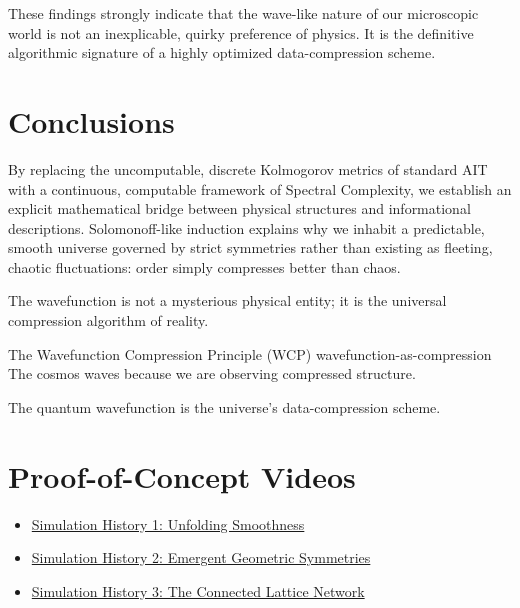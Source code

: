 These findings strongly indicate that the wave-like nature of our microscopic world is not an inexplicable, quirky preference of physics.
It is the definitive algorithmic signature of a highly optimized data-compression scheme.

\section{Conclusions}

By replacing the uncomputable, discrete Kolmogorov metrics of standard AIT with a continuous, computable framework of Spectral Complexity, we establish an explicit mathematical bridge between physical structures and informational descriptions.
Solomonoff-like induction explains why we inhabit a predictable, smooth universe governed by strict symmetries rather than existing as fleeting, chaotic fluctuations: order simply compresses
better than chaos.

The wavefunction is not a mysterious physical entity; it is the universal compression algorithm of reality.

\begin{principle}{The Wavefunction Compression Principle (WCP)}
{wavefunction-as-compression}
The cosmos waves because we are observing compressed structure.

The quantum wavefunction is the universe's data-compression scheme.
\end{principle}

\section{Proof-of-Concept Videos}

\begin{itemize}
    \item \href{https://youtube.com/shorts/sfwz_O_soS4?feature=share}{Simulation History 1: Unfolding Smoothness}
    \item \href{https://youtube.com/shorts/5XYXhmOgiW8}{Simulation History 2: Emergent Geometric Symmetries}
    \item \href{https://youtube.com/shorts/XAMWDg5zX6I}{Simulation History 3: The Connected Lattice Network}
\end{itemize}
